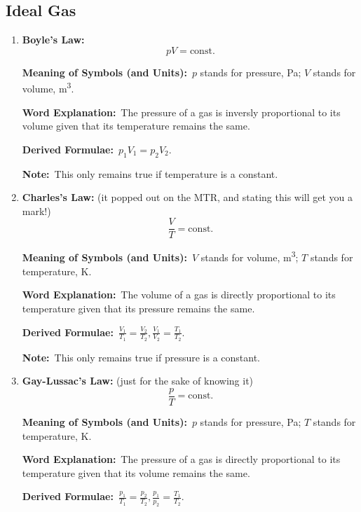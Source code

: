 \documentclass[8pt]{article}
\newcommand{\MeanSymb}{\textbf{Meaning of Symbols (and Units):}\ }
\newcommand{\WordExpl}{\textbf{Word Explanation:}\ }
\newcommand{\DeriForm}{\textbf{Derived Formulae:}\ }
\newcommand{\Note}{\textbf{Note:}\ }
\begin{document}
        \subsection{Ideal Gas}
            \begin{enumerate}
                \item \textbf{Boyle's Law:}
                \[
                    pV = \mathrm{const.}
                \]

                \MeanSymb \(p\) stands for pressure, \unit{\pascal}; \(V\) stands for volume, \unit{\metre \cubed}.

                \WordExpl The pressure of a gas is inversly proportional to its volume given that its temperature remains the same.

                \DeriForm \(p_1 V_1 = p_2 V_2\).

                \Note This only remains true if temperature is a constant.
                
                \item \textbf{Charles's Law:} (it popped out on the MTR, and stating this will get you a mark!)
                \[
                    \frac{V}{T} = \mathrm{const.}
                \]

                \MeanSymb \(V\) stands for volume, \unit{\metre \cubed}; \(T\) stands for temperature, \unit{\kelvin}.

                \WordExpl The volume of a gas is directly proportional to its temperature given that its pressure remains the same.

                \DeriForm \(\frac{V_1}{T_1} = \frac{V_2}{T_2}, \frac{V_1}{V_2} = \frac{T_1}{T_2}\).

                \Note This only remains true if pressure is a constant.
                
                \item \textbf{Gay-Lussac's Law:} (just for the sake of knowing it)
                \[
                    \frac{p}{T} = \mathrm{const.}
                \]

                \MeanSymb \(p\) stands for pressure, \unit{\pascal}; \(T\) stands for temperature, \unit{\kelvin}.

                \WordExpl The pressure of a gas is directly proportional to its temperature given that its volume remains the same.

                \DeriForm \(\frac{p_1}{T_1} = \frac{p_2}{T_2}, \frac{p_1}{p_2} = \frac{T_1}{T_2}\).


\end{enumerate}
\end{document}
